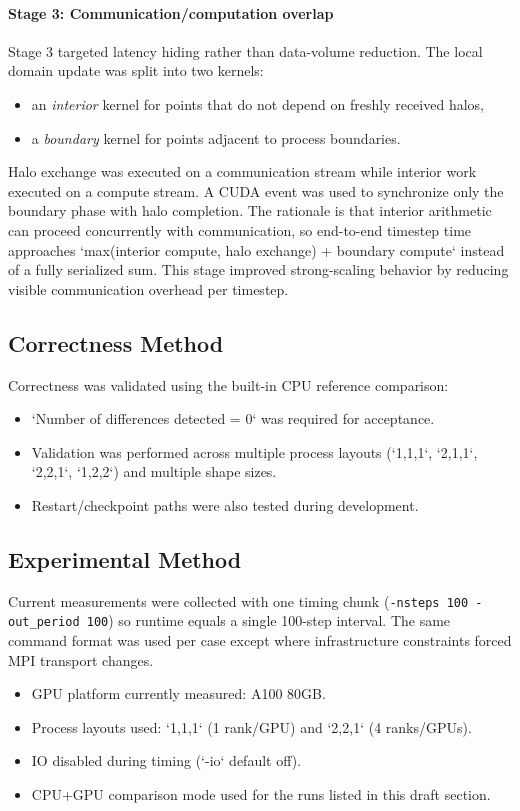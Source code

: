 \documentclass[11pt]{article}
\begin{document}
\paragraph{Stage 3: Communication/computation overlap}
Stage 3 targeted latency hiding rather than data-volume reduction. The local domain update was split into two kernels:
\begin{itemize}[leftmargin=*]
\item an \emph{interior} kernel for points that do not depend on freshly received halos,
\item a \emph{boundary} kernel for points adjacent to process boundaries.
\end{itemize}
Halo exchange was executed on a communication stream while interior work executed on a compute stream. A CUDA event was used to synchronize only the boundary phase with halo completion. The rationale is that interior arithmetic can proceed concurrently with communication, so end-to-end timestep time approaches `max(interior compute, halo exchange) + boundary compute` instead of a fully serialized sum. This stage improved strong-scaling behavior by reducing visible communication overhead per timestep.

\subsection{Correctness Method}
Correctness was validated using the built-in CPU reference comparison:
\begin{itemize}[leftmargin=*]
\item `Number of differences detected = 0` was required for acceptance.
\item Validation was performed across multiple process layouts (`1,1,1`, `2,1,1`, `2,2,1`, `1,2,2`) and multiple shape sizes.
\item Restart/checkpoint paths were also tested during development.
\end{itemize}

\subsection{Experimental Method}
Current measurements were collected with one timing chunk (\texttt{-nsteps 100 -out\_period 100}) so runtime equals a single 100-step interval. The same command format was used per case except where infrastructure constraints forced MPI transport changes.
\begin{itemize}[leftmargin=*]
\item GPU platform currently measured: A100 80GB.
\item Process layouts used: `1,1,1` (1 rank/GPU) and `2,2,1` (4 ranks/GPUs).
\item IO disabled during timing (`-io` default off).
\item CPU+GPU comparison mode used for the runs listed in this draft section.
\end{itemize}
\end{document}
